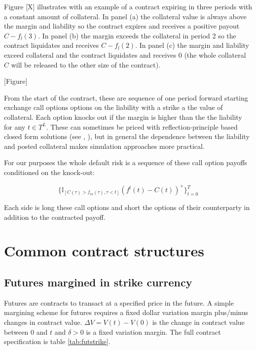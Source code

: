 \documentclass[12pt]{article}
\begin{document}
Figure [X] illustrates with an example of a contract expiring in three periods with a constant amount of collateral. In panel (a) the collateral value is always above the margin and liability so the contract expires and receives a positive payout $C-f_l(3)$. In panel (b) the margin exceeds the collateral in period 2 so the contract liquidates and receives $C-f_l(2)$. In panel (c) the margin and liability exceed collateral and the contract liquidates and receives 0 (the whole collateral $C$ will be released to the other size of the contract).

[Figure]

From the start of the contract, these are sequence of one period forward starting exchange call options options on the liability with a strike a the value of collateral. Each option knocks out if the margin is higher than the the liability for any $t \in T^L$. These can sometimes be priced with reflection-principle based closed form solutions (see \cite{Gaarder02}, \cite{Poulsen06}), but in general the dependence between the liability and posted collateral makes simulation approaches more practical. 

For our purposes the whole default risk is a sequence of these call option payoffs conditioned on the knock-out: 

\begin{equation}
\{\mathbb{I}_{[C(\tau) > f_m(\tau),  \tau<t ]} (f^l(t)-C(t))^+ \}_{t=0}^T  
\end{equation}

Each side is long these call options and short the options of their counterparty in addition to the contracted payoff.

\section{Common contract structures}


\subsection{Futures margined in strike currency}

Futures are contracts to transact at a specified price in the future. A simple margining scheme for futures requires a fixed dollar variation margin plus/minus changes in contract value.  $\Delta V = V(t)-V(0)$ is the change in contract value between 0 and $t$ and $\delta>0$ is a fixed variation margin. The full contract specification is table \ref{tab:futstrike}.
\end{document}
